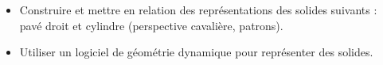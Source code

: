 \begin{prerequis}    
    \begin{itemize}
        \item[\emoji{diamond-suit}] Construire et mettre en relation des représentations des solides suivants : pavé droit et cylindre (perspective cavalière, patrons).
        \item[\emoji{diamond-suit}] Utiliser un logiciel de géométrie dynamique pour représenter des solides.
    \end{itemize}
\end{prerequis}
